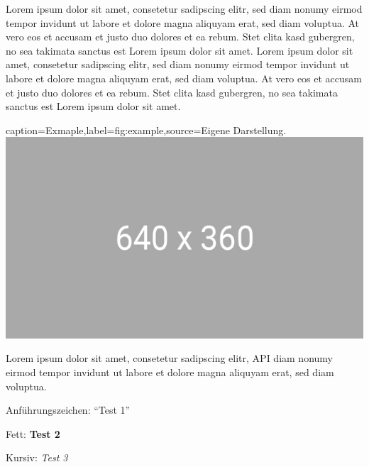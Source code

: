 Lorem ipsum dolor sit amet, consetetur sadipscing elitr, sed diam nonumy eirmod tempor invidunt ut labore et dolore magna aliquyam erat, sed diam voluptua. At vero eos et accusam et justo duo dolores et ea rebum. Stet clita kasd gubergren, no sea takimata sanctus est Lorem ipsum dolor sit amet. Lorem ipsum dolor sit amet, consetetur sadipscing elitr, sed diam nonumy eirmod tempor invidunt ut labore et dolore magna aliquyam erat, sed diam voluptua. At vero eos et accusam et justo duo dolores et ea rebum. Stet clita kasd gubergren, no sea takimata sanctus est Lorem ipsum dolor sit amet.

\begin{dhbwfigure}{caption=Exmaple,label=fig:example,source={Eigene Darstellung.}}
    \includegraphics[width=\textwidth]{assets/figures/example.jpg}
\end{dhbwfigure}

Lorem ipsum dolor sit amet, consetetur sadipscing elitr, \ac{API} diam nonumy eirmod tempor invidunt ut labore et dolore magna aliquyam erat, sed diam voluptua. 

Anführungszeichen: \enquote{Test 1}

Fett: \textbf{Test 2}

Kursiv: \textit{Test 3}